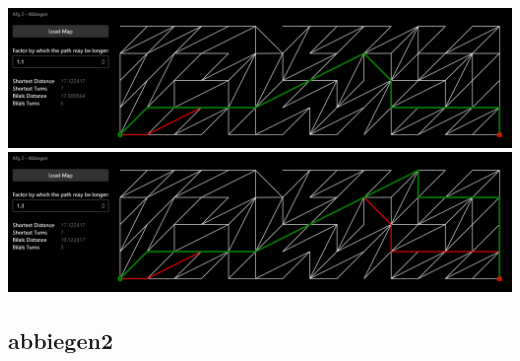 \documentclass{article}
\begin{document}
\begin{center}
\includegraphics[width=\textwidth]{examples/1_10.png}
\includegraphics[width=\textwidth]{examples/1_30.png}
\end{center}

\subsection{abbiegen2}
\end{document}
